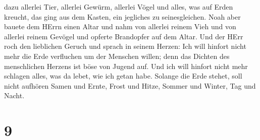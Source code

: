  dazu allerlei Tier, allerlei Gewürm, allerlei Vögel und
alles, was auf Erden kreucht, das ging aus dem Kasten, ein jegliches zu
seinesgleichen.  Noah aber bauete dem HErrn einen Altar und
nahm von allerlei reinem Vieh und von allerlei reinem Gevögel und
opferte Brandopfer auf dem Altar.  Und der HErr roch den
lieblichen Geruch und sprach in seinem Herzen: Ich will hinfort nicht
mehr die Erde verfluchen um der Menschen willen; denn das Dichten des
menschlichen Herzens ist böse von Jugend auf. Und ich will hinfort nicht
mehr schlagen alles, was da lebet, wie ich getan habe. 
Solange die Erde stehet, soll nicht aufhören Samen und Ernte, Frost und
Hitze, Sommer und Winter, Tag und Nacht.

\hypertarget{section-8}{%
\section{9}\label{section-8}}

